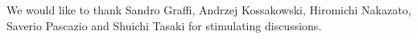 \documentclass[aip,jmp
]{revtex4}
\theoremstyle{definition}
\begin{document}
%
\acknowledgments
We would  like to thank Sandro Graffi,
Andrzej Kossakowski, Hiromichi Nakazato, Saverio Pascazio and Shuichi Tasaki  for stimulating
discussions.
%
% 
% 
%
\end{document}
